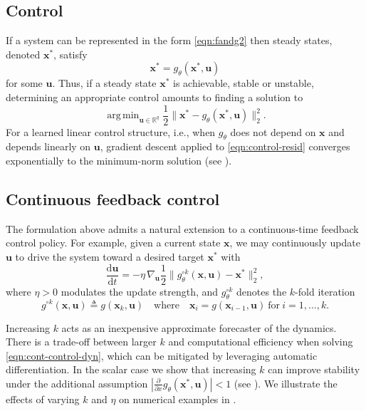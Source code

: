 \documentclass[11pt,twoside]{article}
\theoremstyle{plain}
\theoremstyle{definition}
\theoremstyle{remark}
\DeclareMathOperator*{\argmin}{arg\,min}
\newcommand{\vect}[1]{\boldsymbol{#1}}
\begin{document}
\subsection{Control}
If a system can be represented in the form \cref{eqn:fandg2} then steady states, denoted \(\vect{x}^*\), satisfy
\[
    \vect{x}^* = g_\theta(\vect{x}^*, \vect{u})
\]
for some \(\vect{u}\). Thus, if a steady state \(\vect{x}^*\) is achievable, stable or unstable, determining an appropriate control amounts to finding a solution to
\begin{equation}
    \argmin_{\vect{u} \in \mathbb{R}^q}
    \frac{1}{2} \bigl\| \vect{x}^* - g_\theta(\vect{x}^*, \vect{u}) \bigr\|_2^2.
    \label{eqn:control-resid}
\end{equation}
For a learned linear control structure, i.e., when \(g_\theta\) does not depend on \(\vect{x}\) and depends linearly on \(\vect{u}\), gradient descent applied to \cref{eqn:control-resid} converges exponentially to the minimum-norm solution (see ).

\subsection{Continuous feedback control}
The formulation above admits a natural extension to a continuous-time feedback control policy. For example, given a current state \(\vect{x}\), we may continuously update \(\vect{u}\) to drive the system toward a desired target \(\vect{x}^*\) with
\begin{equation}
    \frac{\mathrm{d}\vect{u}}{\mathrm{d}t}
    = -\eta \, \nabla_{\vect{u}} 
    \frac{1}{2}
    \bigl\| g_\theta^{\circ k}(\vect{x}, \vect{u}) - \vect{x}^* \bigr\|_2^2,
    \label{eqn:cont-control-dyn}
\end{equation}
where \(\eta > 0\) modulates the update strength, and \(g_\theta^{\circ k}\) denotes the \(k\)-fold iteration
\begin{equation}
    g^{\circ k}(\vect{x},\vect{u}) \triangleq g(\vect{x}_{k},\vect{u}) \quad \text{where} \quad \vect{x}_i = g(\vect{x}_{i-1},\vect{u}) \: \text{for} \: i=1,\hdots,k.
    \label{eqn:g-iter}
\end{equation}

Increasing \(k\) acts as an inexpensive approximate forecaster of the dynamics. There is a trade-off between larger \(k\) and computational efficiency when solving \cref{eqn:cont-control-dyn}, which can be mitigated by leveraging automatic differentiation. In the scalar case we show that increasing \(k\) can improve stability under the additional assumption \(|\frac{\partial}{\partial x} g_\theta(\vect{x}^*,\vect{u})| < 1\) (see ).
 We illustrate the effects of varying \(k\) and \(\eta\) on numerical examples in .
\end{document}
